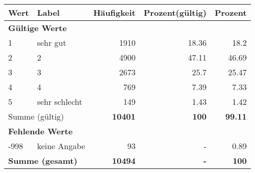      \begin{longtable}{lXrrr}
     \toprule
     \textbf{Wert} & \textbf{Label} & \textbf{Häufigkeit} & \textbf{Prozent(gültig)} & \textbf{Prozent} \\
     \endhead
     \midrule
     \multicolumn{5}{l}{\textbf{Gültige Werte}}\\

     1 &
     \multicolumn{1}{X}{ sehr gut   } &


       \num{1910} &
       \num[round-mode=places,round-precision=2]{18,36} &
         \num[round-mode=places,round-precision=2]{18,2} \\

     2 &
     \multicolumn{1}{X}{ 2   } &


       \num{4900} &
       \num[round-mode=places,round-precision=2]{47,11} &
         \num[round-mode=places,round-precision=2]{46,69} \\

     3 &
     \multicolumn{1}{X}{ 3   } &


       \num{2673} &
       \num[round-mode=places,round-precision=2]{25,7} &
         \num[round-mode=places,round-precision=2]{25,47} \\

     4 &
     \multicolumn{1}{X}{ 4   } &


       \num{769} &
       \num[round-mode=places,round-precision=2]{7,39} &
         \num[round-mode=places,round-precision=2]{7,33} \\

     5 &
     \multicolumn{1}{X}{ sehr schlecht   } &


       \num{149} &
       \num[round-mode=places,round-precision=2]{1,43} &
         \num[round-mode=places,round-precision=2]{1,42} \\
     \midrule
     \multicolumn{2}{l}{Summe (gültig)} &
       \textbf{\num{10401}} &
     \textbf{100} &
       \textbf{\num[round-mode=places,round-precision=2]{99,11}} \\
     \multicolumn{5}{l}{\textbf{Fehlende Werte}}\\
       -998 &
       keine Angabe &
         \num{93} &
        - &
         \num[round-mode=places,round-precision=2]{0,89} \\
     \midrule
     \multicolumn{2}{l}{\textbf{Summe (gesamt)}} &
          \textbf{\num{10494}} &
        \textbf{-} &
        \textbf{100} \\
     \bottomrule
     \end{longtable}
     
